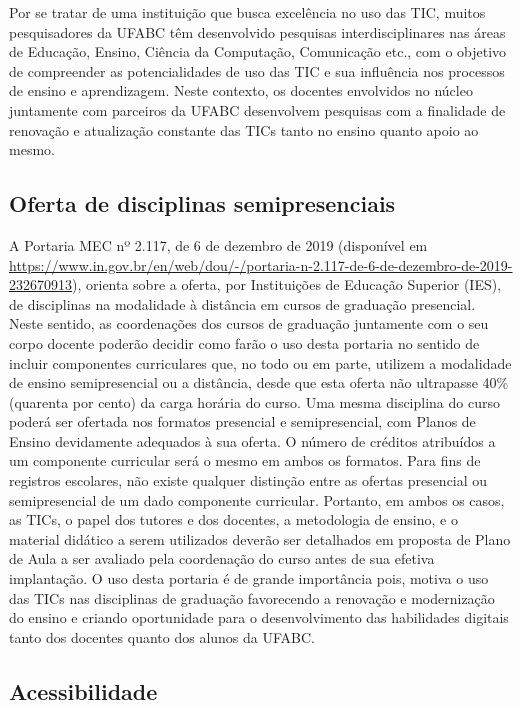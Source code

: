 Por se tratar de uma instituição que busca excelência no uso das TIC, muitos
pesquisadores da UFABC têm desenvolvido pesquisas interdisciplinares nas áreas
de Educação, Ensino, Ciência da Computação, Comunicação etc., com o objetivo de
compreender as potencialidades de uso das TIC e sua influência nos processos de
ensino e aprendizagem. 
Neste contexto, os docentes envolvidos no núcleo juntamente com parceiros da
UFABC desenvolvem pesquisas com a finalidade de renovação e atualização
constante das TICs tanto no ensino quanto apoio ao mesmo.

\subsection{Oferta de disciplinas semipresenciais}

A Portaria MEC nº 2.117, de 6 de dezembro de 2019 (disponível em
\url{https://www.in.gov.br/en/web/dou/-/portaria-n-2.117-de-6-de-dezembro-de-2019-232670913}),
orienta sobre a oferta, por Instituições de Educação Superior (IES), de
disciplinas na modalidade à distância em cursos de graduação presencial. 
Neste sentido, as coordenações dos cursos de graduação juntamente com o seu
corpo docente poderão decidir como farão o uso desta portaria no sentido de
incluir componentes curriculares que, no todo ou em parte, utilizem a
modalidade de ensino semipresencial ou a distância, desde que esta oferta não
ultrapasse 40\% (quarenta por cento) da carga horária do curso. 
Uma mesma disciplina do curso poderá ser ofertada nos formatos presencial e
semipresencial, com Planos de Ensino devidamente adequados à sua oferta.
O número de créditos atribuídos a um componente curricular será o mesmo em
ambos os formatos. 
Para fins de registros escolares, não existe qualquer distinção entre as
ofertas presencial ou semipresencial de um dado componente curricular.
Portanto, em ambos os casos, as TICs, o papel dos tutores e dos docentes, a
metodologia de ensino, e o material didático a serem utilizados deverão ser
detalhados em proposta de Plano de Aula a ser avaliado pela coordenação do
curso antes de sua efetiva implantação. 
O uso desta portaria é de grande importância pois, motiva o uso das TICs nas
disciplinas de graduação favorecendo a renovação e modernização do ensino e
criando oportunidade para o desenvolvimento das habilidades digitais tanto dos
docentes quanto dos alunos da UFABC.

\subsection{Acessibilidade}

